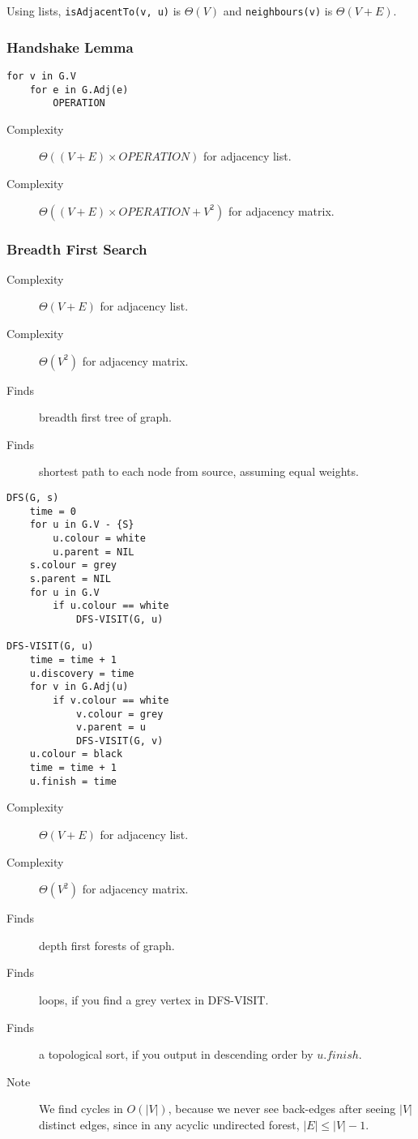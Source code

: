 \documentclass[10pt, a4paper,landscape]{article}
\begin{document}
\begin{multicols*}{4}
Using lists, \texttt{isAdjacentTo(v, u)} is $\Theta(V)$ and \texttt{neighbours(v)} is $\Theta(V + E)$.

\subsubsection{Handshake Lemma}
\begin{lstlisting}
for v in G.V
    for e in G.Adj(e)
        OPERATION
\end{lstlisting}
\begin{description}
    \item[Complexity] $\Theta((V+E) \times OPERATION)$ for adjacency list.
    \item[Complexity] $\Theta((V+E) \times OPERATION + V^2)$ for adjacency matrix.
\end{description}

\subsubsection{Breadth First Search}
\begin{description}
    \item[Complexity] $\Theta(V+E)$ for adjacency list.
    \item[Complexity] $\Theta(V^2)$ for adjacency matrix.
    \item[Finds] breadth first tree of graph.
    \item[Finds] shortest path to each node from source, assuming equal weights.
\end{description}

\begin{lstlisting}
DFS(G, s)
    time = 0
    for u in G.V - {S}
        u.colour = white
        u.parent = NIL
    s.colour = grey
    s.parent = NIL
    for u in G.V
        if u.colour == white
            DFS-VISIT(G, u)

DFS-VISIT(G, u)
    time = time + 1
    u.discovery = time
    for v in G.Adj(u)
        if v.colour == white
            v.colour = grey
            v.parent = u
            DFS-VISIT(G, v)
    u.colour = black
    time = time + 1
    u.finish = time
\end{lstlisting}
\begin{description}
    \item[Complexity] $\Theta(V+E)$ for adjacency list.
    \item[Complexity] $\Theta(V^2)$ for adjacency matrix.
    \item[Finds] depth first forests of graph.
    \item[Finds] loops, if you find a grey vertex in DFS-VISIT.
    \item[Finds] a topological sort, if you output in descending order by $u.finish$.
    \item[Note] We find cycles in $O(|V|)$, because we never see back-edges after seeing $|V|$ distinct edges, since in any acyclic undirected forest, $|E| \leq |V| - 1$. 
\end{description}


\end{multicols*}
\end{document}

